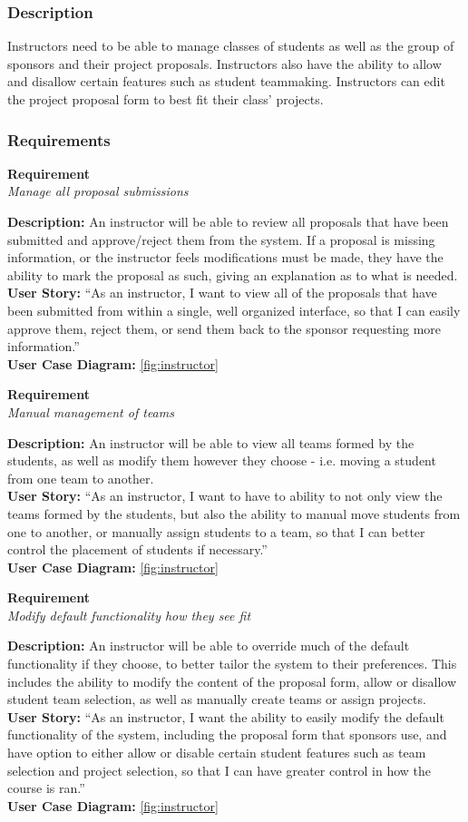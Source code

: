 \documentclass[12pt]{article}
\newcommand{\requirement}[4] {
		\noindent
		\begin{center}\textbf{Requirement\\}\textit{#1}\\\end{center}
		\textbf{Description:} #2\\
		\textbf{User Story:} ``#3''\\
		\textbf{User Case Diagram:} #4\\
}
\begin{document}
\subsubsection{Description}

Instructors need to be able to manage classes of students as well as the group of sponsors and their project proposals. Instructors also have the ability to allow and disallow certain features such as student teammaking. Instructors can edit the project proposal form to best fit their class’ projects.

\subsubsection{Requirements}

\requirement{Manage all proposal submissions}
			{An instructor will be able to review all proposals that have been submitted and approve/reject them from the system. If a proposal is missing information, or the instructor feels modifications must be made, they have the ability to mark the proposal as such, giving an explanation as to what is needed. }
			{As an instructor, I want to view all of the proposals that have been submitted from within a single, well organized interface, so that I can easily approve them, reject them, or send them back to the sponsor requesting more information.}
			{\autoref{fig:instructor}}

\requirement{Manual management of teams}
			{An instructor will be able to view all teams formed by the students, as well as modify them however they choose - i.e. moving a student from one team to another.}
			{As an instructor, I want to have to ability to not only view the teams formed by the students, but also the ability to manual move students from one to another, or manually assign students to a team, so that I can better control the placement of students if necessary.}
			{\autoref{fig:instructor}}

\requirement{Modify default functionality how they see fit}
			{An instructor will be able to override much of the default functionality if they choose, to better tailor the system to their preferences. This includes the ability to modify the content of the proposal form, allow or disallow student team selection, as well as manually create teams or assign projects.}
			{As an instructor, I want the ability to easily modify the default functionality of the system, including the proposal form that sponsors use, and have option to either allow or disable certain student features such as team selection and project selection, so that I can have greater control in how the course is ran.}
			{\autoref{fig:instructor}}
\end{document}
